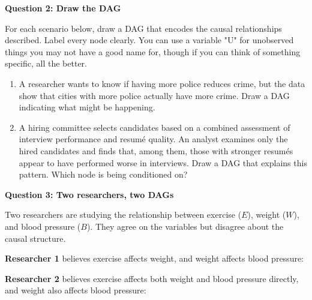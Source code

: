 \documentclass[11pt]{article}
\begin{document}
\noindent\textbf{Question 2: Draw the DAG}

\medskip
\noindent For each scenario below, draw a DAG that encodes the causal relationships described.  Label every node clearly. You can use a variable "U" for unobserved things you may not have a good name for, though if you can think of something specific, all the better. 

\clearpage

\begin{enumerate}[label=(\alph*)]
\item A researcher wants to know if having more police reduces crime, but the data show that cities with more police actually have more crime. Draw a DAG indicating what might be happening. 

\vspace{3cm}

\item A hiring committee selects candidates based on a combined assessment of interview performance and resum\'e quality.  An analyst examines only the hired candidates and finds that, among them, those with stronger resum\'es appear to have performed worse in interviews. Draw a DAG that explains this pattern. Which node is being conditioned on?

\vspace{3cm}
\end{enumerate}

\noindent\textbf{Question 3: Two researchers, two DAGs}

\medskip
\noindent Two researchers are studying the relationship between exercise ($E$), weight ($W$), and blood pressure ($B$). They agree on the variables but disagree about the causal structure.

\medskip
\noindent \textbf{Researcher 1} believes exercise affects weight, and weight affects blood pressure:

\begin{center}
\end{center}

\noindent \textbf{Researcher 2} believes exercise affects both weight and blood pressure directly, and weight also affects blood pressure:
\end{document}
